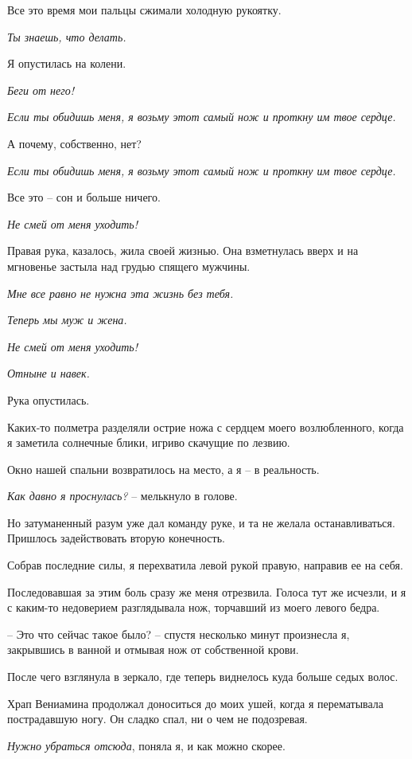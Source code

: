 \documentclass[
]{book}
\begin{document}
Все это время мои пальцы сжимали холодную рукоятку.

\emph{Ты знаешь, что делать.}

Я опустилась на колени.

\emph{Беги от него!}

\emph{Если ты обидишь меня, я возьму этот самый нож и проткну им твое сердце.}

А почему, собственно, нет?

\emph{Если ты обидишь меня, я возьму этот самый нож и проткну им твое сердце.}

Все это -- сон и больше ничего.

\emph{Не смей от меня уходить!}

Правая рука, казалось, жила своей жизнью. Она взметнулась вверх и на мгновенье застыла над грудью спящего мужчины.

\emph{Мне все равно не нужна эта жизнь без тебя.}

\emph{Теперь мы муж и жена.}

\emph{Не смей от меня уходить!}

\emph{Отныне и навек.}

Рука опустилась.

Каких-то полметра разделяли острие ножа с сердцем моего возлюбленного, когда я заметила солнечные блики, игриво скачущие по лезвию.

Окно нашей спальни возвратилось на место, а я -- в реальность.

\emph{Как давно я проснулась?} -- мелькнуло в голове.

Но затуманенный разум уже дал команду руке, и та не желала останавливаться. Пришлось задействовать вторую конечность.

Собрав последние силы, я перехватила левой рукой правую, направив ее на себя.

Последовавшая за этим боль сразу же меня отрезвила. Голоса тут же исчезли, и я с каким-то недоверием разглядывала нож, торчавший из моего левого бедра.

-- Это что сейчас такое было? -- спустя несколько минут произнесла я, закрывшись в ванной и отмывая нож от собственной крови.

После чего взглянула в зеркало, где теперь виднелось куда больше седых волос.

Храп Вениамина продолжал доноситься до моих ушей, когда я перематывала пострадавшую ногу. Он сладко спал, ни о чем не подозревая.

\emph{Нужно убраться отсюда}, поняла я, и как можно скорее.
\end{document}
